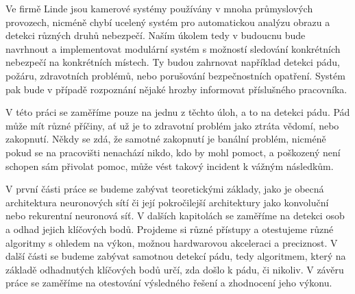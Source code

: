 Ve firmě Linde jsou kamerové systémy používány v mnoha průmyslových provozech,
nicméně chybí ucelený systém pro automatickou analýzu obrazu a detekci různých
druhů nebezpečí. Naším úkolem tedy v budoucnu bude navrhnout a implementovat
modulární systém s možností sledování konkrétních nebezpečí na konkrétních
místech. Ty budou zahrnovat například detekci pádu, požáru, zdravotních
problémů, nebo porušování bezpečnostních opatření. Systém pak bude v případě
rozpoznání nějaké hrozby informovat příslušného pracovníka.

V této práci se zaměříme pouze na jednu z těchto úloh, a to na detekci pádu.
Pád může mít různé příčiny, ať už je to zdravotní problém jako ztráta vědomí,
nebo zakopnutí. Někdy se zdá, že samotné zakopnutí je banální problém, nicméně
pokud se na pracovišti nenachází nikdo, kdo by mohl pomoct, a poškozený není
schopen sám přivolat pomoc, může vést takový incident k vážným následkům.

V první části práce se budeme zabývat teoretickými základy, jako je obecná
architektura neuronových sítí či její pokročilejší architektury jako konvoluční
nebo rekurentní neuronová síť. V dalších kapitolách se zaměříme na detekci osob
a odhad jejich klíčových bodů. Projdeme si různé přístupy a otestujeme různé
algoritmy s ohledem na výkon, možnou hardwarovou akceleraci a preciznost. V
další části se budeme zabývat samotnou detekcí pádu, tedy algoritmem, který na
základě odhadnutých klíčových bodů určí, zda došlo k pádu, či nikoliv. V závěru
práce se zaměříme na otestování výsledného řešení a zhodnocení jeho výkonu.

\endinput